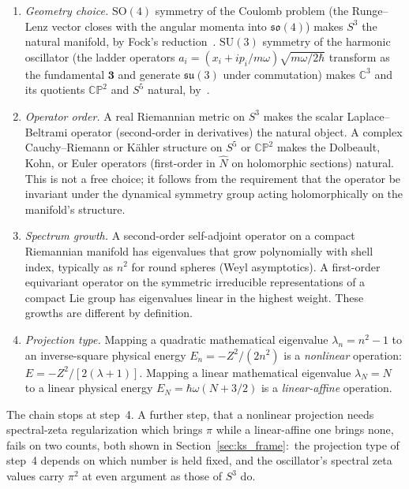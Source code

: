 \documentclass[twocolumn,pra,amsmath,amssymb,superscriptaddress]{revtex4-2}
\begin{document}
\begin{enumerate}
\item \emph{Geometry choice.}  $\mathrm{SO}(4)$ symmetry of the
  Coulomb problem (the Runge--Lenz vector closes with the angular
  momenta into $\mathfrak{so}(4)$) makes $S^3$ the natural
  manifold, by Fock's reduction~\cite{fock1935}.  $\mathrm{SU}(3)$
  symmetry of the harmonic oscillator (the ladder operators
  $a_i = (x_i + i p_i / m\omega) \sqrt{m\omega / 2\hbar}$
  transform as the fundamental $\mathbf{3}$ and generate
  $\mathfrak{su}(3)$ under commutation) makes $\mathbb{C}^3$ and
  its quotients $\mathbb{CP}^2$ and $S^5$ natural,
  by~\cite{jauchhill1940}.

\item \emph{Operator order.}  A real Riemannian metric on $S^3$
  makes the scalar Laplace--Beltrami operator (second-order in
  derivatives) the natural object.  A complex Cauchy--Riemann or
  K\"ahler structure on $S^5$ or $\mathbb{CP}^2$ makes the
  Dolbeault, Kohn, or Euler operators (first-order in $\hat{N}$
  on holomorphic sections) natural.  This is not a free choice;
  it follows from the requirement that the operator be invariant
  under the dynamical symmetry group acting holomorphically on
  the manifold's structure.

\item \emph{Spectrum growth.}  A second-order self-adjoint
  operator on a compact Riemannian manifold has eigenvalues that
  grow polynomially with shell index, typically as $n^2$ for
  round spheres (Weyl asymptotics).  A first-order equivariant
  operator on the symmetric irreducible representations of a
  compact Lie group has eigenvalues linear in the highest weight.
  These growths are different by definition.

\item \emph{Projection type.}  Mapping a quadratic mathematical
  eigenvalue $\lambda_n = n^2 - 1$ to an inverse-square physical
  energy $E_n = -Z^2 / (2 n^2)$ is a \emph{nonlinear} operation:
  $E = -Z^2 / [2(\lambda + 1)]$.  Mapping a linear mathematical
  eigenvalue $\lambda_N = N$ to a linear physical energy $E_N =
  \hbar\omega(N + 3/2)$ is a \emph{linear-affine} operation.

\end{enumerate}

The chain stops at step~4.  A further step, that a nonlinear
projection needs spectral-zeta regularization which brings $\pi$
while a linear-affine one brings none, fails on two counts, both
shown in Section~\ref{sec:ks_frame}:\ the projection type of step~4
depends on which number is held fixed, and the oscillator's spectral
zeta values carry $\pi^2$ at even argument as those of $S^3$ do.
\end{document}
